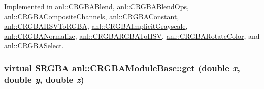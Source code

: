 Implemented in \hyperlink{classanl_1_1CRGBABlend_a6a44d17a9183cbff77d95203270d088a}{anl::CRGBABlend}, \hyperlink{classanl_1_1CRGBABlendOps_a892ffe25081bca07ee526fb77bdc0a09}{anl::CRGBABlendOps}, \hyperlink{classanl_1_1CRGBACompositeChannels_a3964f2c61aa0b8976a40487088dfcc6b}{anl::CRGBACompositeChannels}, \hyperlink{classanl_1_1CRGBAConstant_a198233c5bec1e23e0b786cb340bd3a75}{anl::CRGBAConstant}, \hyperlink{classanl_1_1CRGBAHSVToRGBA_ab5fff0b979c8278e0268a1f3ef924572}{anl::CRGBAHSVToRGBA}, \hyperlink{classanl_1_1CRGBAImplicitGrayscale_a56a233389828df6244a7dbad5722d059}{anl::CRGBAImplicitGrayscale}, \hyperlink{classanl_1_1CRGBANormalize_a42a91db8a13d2b771f81ed1a55ee9eff}{anl::CRGBANormalize}, \hyperlink{classanl_1_1CRGBARGBAToHSV_afffc1b06757cd5a31d4e1adf8621a4b5}{anl::CRGBARGBAToHSV}, \hyperlink{classanl_1_1CRGBARotateColor_a543b68b45b188b430f57fe645ac3e3c6}{anl::CRGBARotateColor}, and \hyperlink{classanl_1_1CRGBASelect_a4822cca441faee7e42bc6f308498ccbb}{anl::CRGBASelect}.\hypertarget{classanl_1_1CRGBAModuleBase_a097897c2d625c824832325260169c90e}{
\subsubsection[{get}]{\setlength{\rightskip}{0pt plus 5cm}virtual {\bf SRGBA} anl::CRGBAModuleBase::get (double {\em x}, \/  double {\em y}, \/  double {\em z})}}
\label{classanl_1_1CRGBAModuleBase_a097897c2d625c824832325260169c90e}


